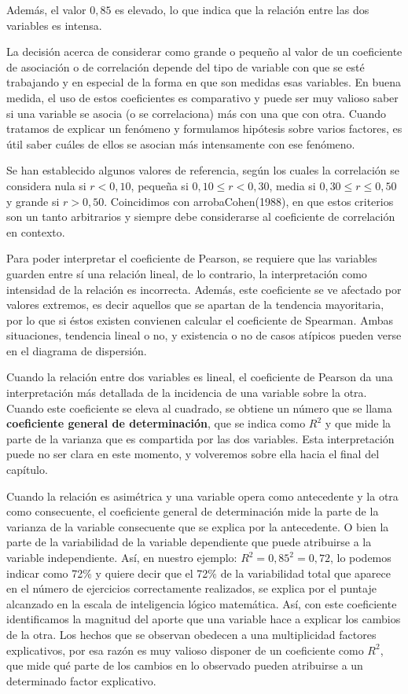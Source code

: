\documentclass[]{book}
\begin{document}
Además, el valor \(0,85\) es elevado, lo que indica que la relación entre
las dos variables es intensa.

La decisión acerca de considerar como grande o pequeño al valor de un
coeficiente de asociación o de correlación depende del tipo de variable
con que se esté trabajando y en especial de la forma en que son medidas
esas variables. En buena medida, el uso de estos coeficientes es
comparativo y puede ser muy valioso saber si una variable se asocia (o
se correlaciona) más con una que con otra. Cuando tratamos de explicar
un fenómeno y formulamos hipótesis sobre varios factores, es útil saber
cuáles de ellos se asocian más intensamente con ese fenómeno.

Se han establecido algunos valores de referencia, según los cuales la
correlación se considera nula si \(r < 0,10\), pequeña si
\(0,10 \leq r < 0,30\), media si \(0,30 \leq r \leq 0,50\) y grande si
\(r > 0,50\). Coincidimos con arrobaCohen(1988), en que estos criterios son un
tanto arbitrarios y siempre debe considerarse al coeficiente de
correlación en contexto.

Para poder interpretar el coeficiente de Pearson, se requiere que las
variables guarden entre sí una relación lineal, de lo contrario, la
interpretación como intensidad de la relación es incorrecta. Además,
este coeficiente se ve afectado por valores extremos, es decir aquellos
que se apartan de la tendencia mayoritaria, por lo que si éstos existen
convienen calcular el coeficiente de Spearman. Ambas situaciones,
tendencia lineal o no, y existencia o no de casos atípicos pueden verse
en el diagrama de dispersión.

Cuando la relación entre dos variables es lineal, el coeficiente de
Pearson da una interpretación más detallada de la incidencia de una
variable sobre la otra. Cuando este coeficiente se eleva al cuadrado, se
obtiene un número que se llama \textbf{coeficiente general de determinación},
que se indica como \(R^{2}\) y que mide la parte de la varianza que es
compartida por las dos variables. Esta interpretación puede no ser clara
en este momento, y volveremos sobre ella hacia el final del capítulo.

Cuando la relación es asimétrica y una variable opera como antecedente y
la otra como consecuente, el coeficiente general de determinación mide
la parte de la varianza de la variable consecuente que se explica por la
antecedente. O bien la parte de la variabilidad de la variable
dependiente que puede atribuirse a la variable independiente. Así, en
nuestro ejemplo: \(R^{2} = {0,85}^{2} = 0,72\), lo podemos indicar como
72\% y quiere decir que el 72\% de la variabilidad total que aparece en el
número de ejercicios correctamente realizados, se explica por el puntaje
alcanzado en la escala de inteligencia lógico matemática. Así, con este
coeficiente identificamos la magnitud del aporte que una variable hace a
explicar los cambios de la otra. Los hechos que se observan obedecen a
una multiplicidad factores explicativos, por esa razón es muy valioso
disponer de un coeficiente como \(R^{2}\), que mide qué parte de los
cambios en lo observado pueden atribuirse a un determinado factor
explicativo.
\end{document}
